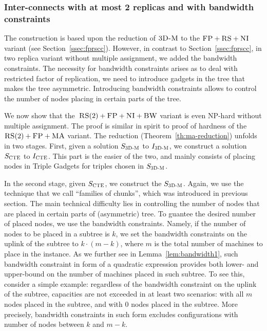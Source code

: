 \subsubsection{Inter-connects with at most 2 replicas and with bandwidth constraints}\label{ap:tworep}


The construction is based upon the reduction of $\textsc{3D-M}$ to the $\textsc{FP}+\textsc{RS}+\textsc{NI}$ variant (see Section~\ref{ssec:fprscc}).
However, in contrast to Section~\ref{ssec:fprscc}, in two replica variant without multiple assignment, we added the bandwidth constraints.
The necessity for bandwidth constraints arises as to deal with restricted factor of replication, we need to introduce gadgets in the tree that makes the tree asymmetric.
Introducing bandwidth constraints allows to control the number of nodes placing in certain parts of the tree.


We now show that the~$\textsc{RS}(2)+\textsc{FP}+\textsc{NI}+\textsc{BW}$ variant is even NP-hard without multiple
assignment.
The proof is similar in spirit to proof of hardness of the~$\textsc{RS}(2)+\textsc{FP}+\textsc{MA}$ variant.
The reduction (Theorem~\ref{th:ma-reduction}) unfolds in two stages.
First, given a solution $S_{\mathrm{\textsc{3D-M}}}$ to $I_{\mathrm{\textsc{3D-M}}}$, we construct a solution $S_{\mathrm{\textsc{CTE}}}$ to $I_{\mathrm{\textsc{CTE}}}$.
This part is the easier of the two, and mainly consists of placing nodes in Triple Gadgets for triples chosen in $S_{\mathrm{\textsc{3D-M}}}$.

In the second stage, given $S_{\mathrm{\textsc{CTE}}}$, we construct the $S_{\mathrm{\textsc{3D-M}}}$.
Again, we use the technique that we call ``families of chunks'', which was introduced in previous section.
The main technical difficulty lies in controlling the number of nodes that are placed in certain parts of (asymmetric) tree.
To guantee the desired number of placed nodes, we use the bandwidth constraints.
Namely, if the number of nodes to be placed in a subtree is $k$, we set the bandwidth constraints on the uplink of the subtree to $k\cdot (m - k)$, where $m$ is the total number of machines to place in the instance.
As we further see in Lemma~\ref{lem:bandwidth1}, such bandwidth constraint in form of a quadratic expression provides both lower- and upper-bound on the number of machines placed in such subtree.
To see this, consider a simple example: regardless of the bandwidth constraint on the uplink of the subtree, capacities are not exceeded in at least two scenarios: with all $m$ nodes placed in the subtree, and with $0$ nodes placed in the subtree.
More precisely, bandwidth constraints in such form excludes configurations with number of nodes between $k$ and $m-k$.

